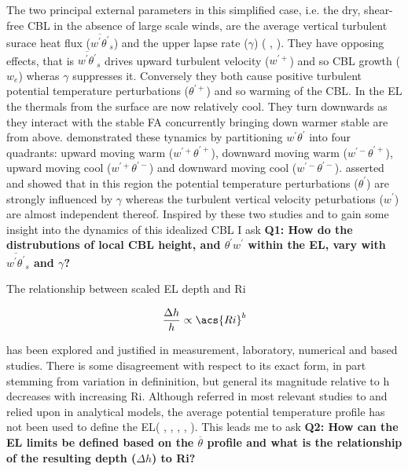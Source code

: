 The two principal external parameters in this simplified case, i.e. the dry, shear-free \acs{CBL} in the absence of large scale winds, are the average vertical turbulent surace heat flux ($\overline{w^{'}\theta^{'}}_{s}$) and the upper lapse rate ($\gamma$) (\citeauthor{FedConzMir04} \citeyear{FedConzMir04},\citeauthor{Sorbjan} \citeyear{Sorbjan}).  They have opposing effects, that is $\overline{w^{'}\theta^{'}}_{s}$ drives upward turbulent velocity ($w^{'+}$) and so \acs{CBL} growth ($w_{e}$) wheras $\gamma$  suppresses it.  Conversely they both cause positive turbulent potential temperature perturbations ($\theta^{'+}$) and so warming of the \acs{CBL}.  In the \acs{EL} the thermals from the surface are now relatively cool.  They turn downwards as they interact with the stable \acs{FA} concurrently bringing down warmer stable are from above.  \citeauthor{SullMoengStev} \citeyear{SullMoengStev} demonstrated these tynamics by partitioning $w^{'} \theta^{'}$ into four quadrants:  upward moving warm ($w^{'+} \theta^{'+}$), downward moving warm ($w^{'-} \theta^{'+}$), upward moving cool ($w^{'+} \theta^{'-}$) and downward moving cool ($w^{'-} \theta^{'-}$).  \citeauthor{Sorbjan} \citeyear{Sorbjan} asserted and showed that in this region the potential temperature perturbations ($\theta^{'}$) are strongly influenced by $\gamma$ whereas the turbulent vertical velocity peturbations ($w^{'}$) are almost independent thereof. Inspired by these two studies and to gain some insight into the dynamics of this idealized \acs{CBL} I ask \textbf{Q1: How do the distrubutions of local \acs{CBL} height, and $\theta^{'}w^{'}$ within the \acs{EL}, vary with $\overline{w^{'}\theta^{'}}_{s}$ and $\gamma$?}

The relationship between scaled \acs{EL} depth and \acs{Ri} 

\begin{equation}
\frac{\Delta h}{h} \propto  \acs{Ri}^{b}
\end{equation}

has been explored and justified in measurement, laboratory, numerical and based studies.  There is some disagreement with respect to its exact form, in part stemming from variation in defininition, but general its magnitude relative to h decreases with increasing \acs{Ri}. Although referred in most relevant studies to and relied upon in analytical models, the average potential temperature profile has not been used to define the \acs{EL}(\citeauthor{DearWill80} \citeyear{DearWill80}, \citeauthor{StullNelEl} \citeyear{StullNelEl}, \citeauthor{FedConzMir04} \citeyear{FedConzMir04}, \citeauthor{Boers89} \citeyear{Boers89}, \citeauthor{BrooksFowler2} \citeyear{BrooksFowler2}). This leads me to ask \textbf{Q2: How can the \acs{EL} limits be defined based on the $\overline{\theta}$ profile and what is the relationship of the resulting depth ($\Delta h$) to \acs{Ri}?}\\

